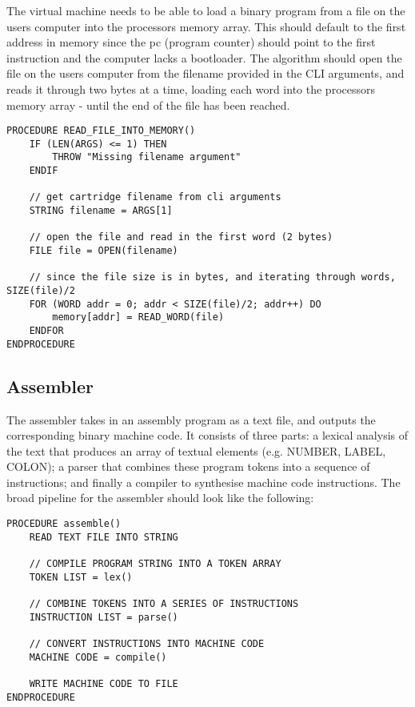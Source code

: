 The virtual machine needs to be able to load a binary program from a file on the users computer into the processors memory array. This should default to the first address in memory since the pc (program counter) should point to the first instruction and the computer lacks a bootloader. The algorithm should open the file on the users computer from the filename provided in the CLI arguments, and reads it through two bytes at a time, loading each word into the processors memory array - until the end of the file has been reached.

\begin{lstlisting}
PROCEDURE READ_FILE_INTO_MEMORY() 
    IF (LEN(ARGS) <= 1) THEN 
        THROW "Missing filename argument"
    ENDIF 

    // get cartridge filename from cli arguments
    STRING filename = ARGS[1] 

    // open the file and read in the first word (2 bytes)
    FILE file = OPEN(filename)

    // since the file size is in bytes, and iterating through words, SIZE(file)/2
    FOR (WORD addr = 0; addr < SIZE(file)/2; addr++) DO
        memory[addr] = READ_WORD(file)
    ENDFOR
ENDPROCEDURE
\end{lstlisting}


\subsection{Assembler}
The assembler takes in an assembly program as a text file, and outputs the corresponding binary machine code. It consists of three parts: a lexical analysis of the text that produces an array of textual elements (e.g. NUMBER, LABEL, COLON); a parser that combines these program tokens into a sequence of instructions; and finally a compiler to synthesise machine code instructions. The broad pipeline for the assembler should look like the following:

\begin{lstlisting}
PROCEDURE assemble() 
    READ TEXT FILE INTO STRING

    // COMPILE PROGRAM STRING INTO A TOKEN ARRAY
    TOKEN LIST = lex()     

    // COMBINE TOKENS INTO A SERIES OF INSTRUCTIONS
    INSTRUCTION LIST = parse()   

    // CONVERT INSTRUCTIONS INTO MACHINE CODE
    MACHINE CODE = compile() 

    WRITE MACHINE CODE TO FILE
ENDPROCEDURE
\end{lstlisting}

